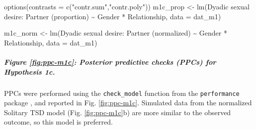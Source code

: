 \documentclass[
  bookmarksnumbered]{article}
\newenvironment{Shaded}{\begin{snugshade}}{\end{snugshade}}
\newcommand{\AttributeTok}[1]{\textcolor[rgb]{0.80,0.80,0.80}{#1}}
\newcommand{\FunctionTok}[1]{\textcolor[rgb]{0.94,0.94,0.56}{#1}}
\newcommand{\NormalTok}[1]{\textcolor[rgb]{0.80,0.80,0.80}{#1}}
\newcommand{\OtherTok}[1]{\textcolor[rgb]{0.94,0.94,0.56}{#1}}
\newcommand{\SpecialCharTok}[1]{\textcolor[rgb]{0.86,0.64,0.64}{#1}}
\newcommand{\StringTok}[1]{\textcolor[rgb]{0.80,0.58,0.58}{#1}}
\begin{document}
\begin{Shaded}
\begin{Highlighting}[]
\FunctionTok{options}\NormalTok{(}\AttributeTok{contrasts =} \FunctionTok{c}\NormalTok{(}\StringTok{"contr.sum"}\NormalTok{,}\StringTok{"contr.poly"}\NormalTok{))}
\NormalTok{m1c\_prop }\OtherTok{\textless{}{-}} \FunctionTok{lm}\NormalTok{(}\StringTok{\textasciigrave{}}\AttributeTok{Dyadic sexual desire: Partner (proportion)}\StringTok{\textasciigrave{}} \SpecialCharTok{\textasciitilde{}}\NormalTok{ Gender }\SpecialCharTok{*}\NormalTok{ Relationship,}
            \AttributeTok{data =}\NormalTok{ dat\_m1)}

\NormalTok{m1c\_norm }\OtherTok{\textless{}{-}} \FunctionTok{lm}\NormalTok{(}\StringTok{\textasciigrave{}}\AttributeTok{Dyadic sexual desire: Partner (normalized)}\StringTok{\textasciigrave{}} \SpecialCharTok{\textasciitilde{}}\NormalTok{ Gender }\SpecialCharTok{*}\NormalTok{ Relationship,}
           \AttributeTok{data =}\NormalTok{ dat\_m1)}
\end{Highlighting}
\end{Shaded}

\subparagraph{Figure \ref{fig:ppc-m1c}: Posterior predictive checks (PPCs) for Hypothesis 1c.}\label{figure-reffigppc-m1c-posterior-predictive-checks-ppcs-for-hypothesis-1c.}

PPCs were performed using the \texttt{check\_model} function from the \texttt{performance} package \autocite{ludecke2021}, and reported in Fig. \ref{fig:ppc-m1c}. Simulated data from the normalized Solitary TSD model (Fig. \ref{fig:ppc-m1c}b) are more similar to the observed outcome, so this model is preferred.
\end{document}
